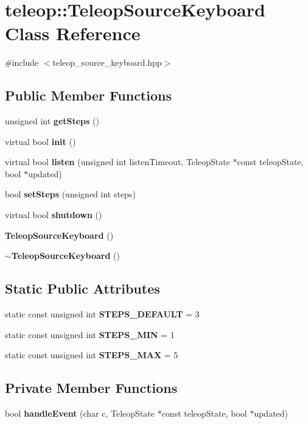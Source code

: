 \section{teleop::TeleopSourceKeyboard Class Reference}
\label{classteleop_1_1TeleopSourceKeyboard}


{\ttfamily \#include $<$teleop\_\-source\_\-keyboard.hpp$>$}

\subsection*{Public Member Functions}
\begin{DoxyCompactItemize}
\item 
unsigned int {\bf getSteps} ()
\item 
virtual bool {\bf init} ()
\item 
virtual bool {\bf listen} (unsigned int listenTimeout, TeleopState $\ast$const teleopState, bool $\ast$updated)
\item 
bool {\bf setSteps} (unsigned int steps)
\item 
virtual bool {\bf shutdown} ()
\item 
{\bf TeleopSourceKeyboard} ()
\item 
{\bf $\sim$TeleopSourceKeyboard} ()
\end{DoxyCompactItemize}
\subsection*{Static Public Attributes}
{\bf }\par
\begin{DoxyCompactItemize}
\item 
static const unsigned int {\bf STEPS\_\-DEFAULT} = 3
\item 
static const unsigned int {\bf STEPS\_\-MIN} = 1
\item 
static const unsigned int {\bf STEPS\_\-MAX} = 5
\end{DoxyCompactItemize}

\subsection*{Private Member Functions}
\begin{DoxyCompactItemize}
\item 
bool {\bf handleEvent} (char c, TeleopState $\ast$const teleopState, bool $\ast$updated)
\end{DoxyCompactItemize}
